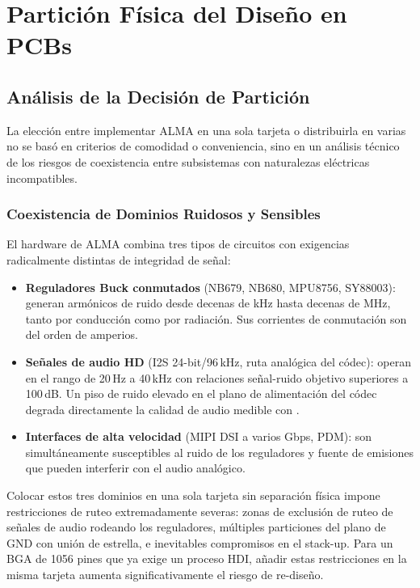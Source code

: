 \chapter{Partición Física del Diseño en PCBs}
\label{chap:particion}

\section{Análisis de la Decisión de Partición}
\label{sec:part_analisis}

La elección entre implementar ALMA en una sola tarjeta o distribuirla en varias
no se basó en criterios de comodidad o conveniencia, sino en un análisis técnico
de los riesgos de coexistencia entre subsistemas con naturalezas eléctricas
incompatibles.

\subsection{Coexistencia de Dominios Ruidosos y Sensibles}

El hardware de ALMA combina tres tipos de circuitos con exigencias radicalmente
distintas de integridad de señal:

\begin{itemize}
  \item \textbf{Reguladores Buck conmutados} (NB679, NB680, MPU8756, SY88003):
    generan armónicos de ruido desde decenas de kHz hasta decenas de MHz, tanto
    por conducción como por radiación. Sus corrientes de conmutación son del orden
    de amperios.
  \item \textbf{Señales de audio HD} (I2S 24-bit/96\,kHz, ruta analógica del códec):
    operan en el rango de 20\,Hz a 40\,kHz con relaciones señal-ruido objetivo
    superiores a 100\,dB. Un piso de ruido elevado en el plano de alimentación del
    códec degrada directamente la calidad de audio medible con .
  \item \textbf{Interfaces de alta velocidad} (MIPI DSI a varios Gbps, PDM):
    son simultáneamente susceptibles al ruido de los reguladores y fuente de
    emisiones que pueden interferir con el audio analógico.
\end{itemize}

Colocar estos tres dominios en una sola tarjeta sin separación física impone
restricciones de ruteo extremadamente severas: zonas de exclusión de ruteo de
señales de audio rodeando los reguladores, múltiples particiones del plano de
GND con unión de estrella, e inevitables compromisos en el stack-up. Para un BGA
de 1056 pines que ya exige un proceso HDI, añadir estas restricciones en la misma
tarjeta aumenta significativamente el riesgo de re-diseño.

